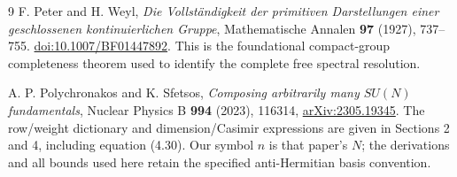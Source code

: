 \documentclass[11pt]{article}
\theoremstyle{definition}
\begin{document}
\begin{thebibliography}{9}
F. Peter and H. Weyl,
\emph{Die Vollst\"andigkeit der primitiven Darstellungen einer
geschlossenen kontinuierlichen Gruppe},
Mathematische Annalen \textbf{97} (1927), 737--755.
\href{https://doi.org/10.1007/BF01447892}{doi:10.1007/BF01447892}.
This is the foundational compact-group completeness theorem used to
identify the complete free spectral resolution.

A. P. Polychronakos and K. Sfetsos,
\emph{Composing arbitrarily many $SU(N)$ fundamentals},
Nuclear Physics B \textbf{994} (2023), 116314,
\href{https://arxiv.org/abs/2305.19345}{arXiv:2305.19345}.
The row/weight dictionary and dimension/Casimir expressions are given
in Sections 2 and 4, including equation (4.30). Our symbol $n$ is that
paper's $N$; the derivations and all bounds used here retain the
specified anti-Hermitian basis convention.
\end{thebibliography}
\end{document}
